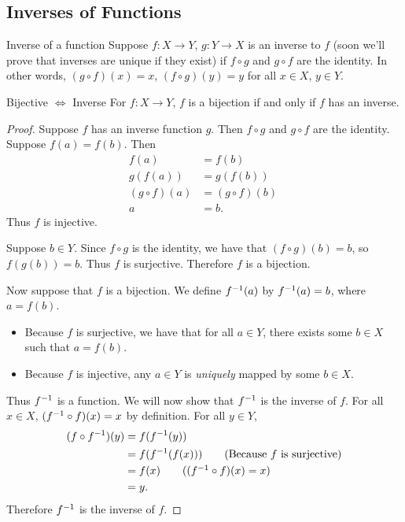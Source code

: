 \documentclass[class=article, crop=false]{standalone}
\begin{document}
  \subsection{Inverses of Functions}
  \begin{definition}{Inverse of a function}
    Suppose $f\colon X\to Y$, $g\colon Y\to X$ is an inverse to $f$ (soon we'll prove that inverses are unique if they exist) if $f\circ g$ and $g\circ f$ are the identity. In other words, $(g\circ f)(x) = x$, $(f\circ g)(y) = y$ for all $x\in X$, $y\in Y$.
  \end{definition}
  \begin{theorem}{Bijective $\iff$ Inverse}
    For $f\colon X\to Y$, $f$ is a bijection if and only if $f$ has an inverse.
  \end{theorem}
  \begin{proof}
    Suppose $f$ has an inverse function $g$. Then $f\circ g$ and $g\circ f$ are the identity. Suppose $f(a) = f(b)$. Then
    \begin{align*}
      f(a) &= f(b) \\
      g(f(a)) &= g(f(b)) \\
      (g\circ f)(a) &= (g\circ f)(b)\ \\
      a &= b.
    \end{align*}
    Thus $f$ is injective. \par
    Suppose $b\in Y$. Since $f\circ g$ is the identity, we have that $(f\circ g)(b) = b$, so $f(g(b)) = b$. Thus $f$ is surjective. Therefore $f$ is a bijection. \par
    Now suppose that $f$ is a bijection. We define $f^{-1}(a)$ by $f^{-1}(a) = b$, where $a=f(b)$.
    \begin{itemize}
      \item Because $f$ is surjective, we have that for all $a\in Y$, there exists some $b\in X$ such that $a = f(b)$.
      \item Because $f$ is injective, any $a\in Y$ is \emph{uniquely} mapped by some $b\in X$.
    \end{itemize}
    Thus $f^{-1}$ is a function. We will now show that $f^{-1}$ is the inverse of $f$. For all $x\in X$, $(f^{-1}\circ f)(x) = x$ by definition. For all $y\in Y$,
    \begin{align*}
      (f\circ f\inv)(y) &= f(f\inv(y)) \\
      &= f(f\inv(f(x))) \tag{Because $f$ is surjective} \\
      &= f(x) \tag{$(f\inv\circ f)(x)=x$} \\
      &= y.
    \end{align*}
    Therefore $f^{-1}$ is the inverse of $f$.
  \end{proof}
\end{document}
